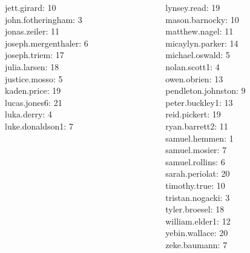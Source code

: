 \documentclass[10pt]{beamer}
\begin{document}
\begin{frame}
\begin{columns}
\begin{column}{0.33\textwidth}
jett.girard: 10 \\ 
john.fotheringham: 3 \\ 
jonas.zeiler: 11 \\ 
joseph.mergenthaler: 6 \\ 
joseph.triem: 17 \\ 
julia.larsen: 18 \\ 
justice.mosso: 5 \\ 
kaden.price: 19 \\ 
lucas.jones6: 21 \\ 
luka.derry: 4 \\ 
luke.donaldson1: 7 \\\end{column}
\begin{column}{0.33\textwidth}
lynsey.read: 19 \\ 
mason.barnocky: 10 \\ 
matthew.nagel: 11 \\ 
micaylyn.parker: 14 \\ 
michael.oswald: 5 \\ 
nolan.scott1: 4 \\ 
owen.obrien: 13 \\ 
pendleton.johnston: 9 \\ 
peter.buckley1: 13 \\ 
reid.pickert: 19 \\ 
ryan.barrett2: 11 \\ 
samuel.hemmen: 1 \\ 
samuel.mosier: 7 \\ 
samuel.rollins: 6 \\ 
sarah.periolat: 20 \\ 
timothy.true: 10 \\ 
tristan.nogacki: 3 \\ 
tyler.broesel: 18 \\ 
william.elder1: 12 \\ 
yebin.wallace: 20 \\ 
zeke.baumann: 7 \\\end{column}
\end{columns}
\vfill
\end{frame}
\end{document}
